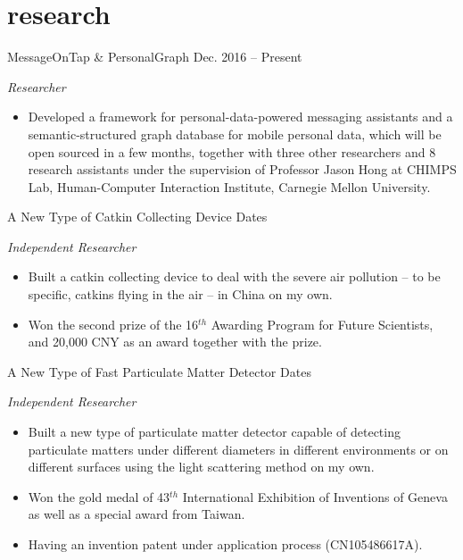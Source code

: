 \documentclass[]{adamyi-cv} %
\begin{document}
\section{research}

\begin{entrylist}


\entry
{MessageOnTap \& PersonalGraph}
{Dec. 2016 -- Present}
{\emph{Researcher}
\begin{itemize}
\item Developed a framework for personal-data-powered messaging assistants and a semantic-structured graph database for mobile personal data, which will be open sourced in a few months, together with three other researchers and 8 research assistants under the supervision of Professor Jason Hong at CHIMPS Lab, Human-Computer Interaction Institute, Carnegie Mellon University.
\end{itemize}}


\entry
{A New Type of Catkin Collecting Device}
{Dates}
{\emph{Independent Researcher}
\begin{itemize}
\item Built a catkin collecting device to deal with the severe air pollution – to be specific, catkins flying in the air – in China on my own.
\item Won the second prize of the 16$^{th}$ Awarding Program for Future Scientists, and 20,000 CNY as an award together with the prize.
\end{itemize}}


\entry
{A New Type of Fast Particulate Matter Detector}
{Dates}
{\emph{Independent Researcher}
\begin{itemize}
\item Built a new type of particulate matter detector capable of detecting particulate matters under different diameters in different environments or on different surfaces using the light scattering method on my own.
\item Won the gold medal of 43$^{th}$ International Exhibition of Inventions of Geneva as well as a special award from Taiwan.
\item Having an invention patent under application process (CN105486617A).
\end{itemize}}


\end{entrylist}
\end{document}

